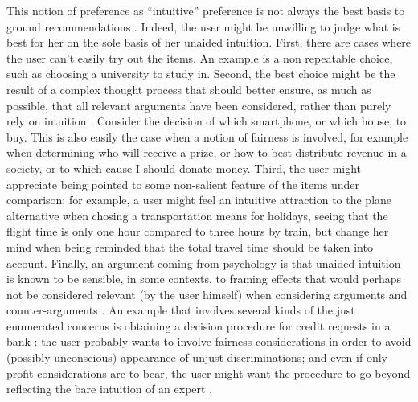 \documentclass[version=3.21, pagesize, twoside=off, bibliography=totoc, DIV=calc, fontsize=12pt, a4paper, french, english]{scrartcl}
\begin{document}
This notion of preference as “intuitive” preference is not always the best basis to ground recommendations . Indeed, the user might be unwilling to judge what is best for her on the sole basis of her unaided intuition. First, there are cases where the user can’t easily try out the items. An example is a non repeatable choice, such as choosing a university to study in. 
Second, the best choice might be the result of a complex thought process that should better ensure, as much as possible, that all relevant arguments have been considered, rather than purely rely on intuition .
Consider the decision of which smartphone, or which house, to buy. 
This is also easily  the case when a notion of fairness is involved, for example when determining who will receive a prize, or how to best distribute revenue in a society, or to which cause I should donate money.
Third, the user might appreciate being pointed to some non-salient feature of the items under comparison; for example, a user might feel an intuitive attraction to the plane alternative when chosing a transportation means for holidays, seeing that the flight time is only one hour compared to three hours by train, but change her mind when being reminded that the total travel time should be taken into account. Finally, an argument coming from psychology is that unaided intuition is known to be sensible, in some contexts, to framing effects that would perhaps not be considered relevant (by the user himself) when considering arguments and counter-arguments \citep{kahneman_thinking_2013}. An example that involves several kinds of the just enumerated concerns  is obtaining a decision procedure for credit requests in a bank : the user  probably wants to involve  fairness considerations in order to avoid (possibly unconscious) appearance  of unjust discriminations; and even if only profit considerations are to bear, the user might want the procedure to go beyond reflecting the bare intuition of an expert .
\end{document}
